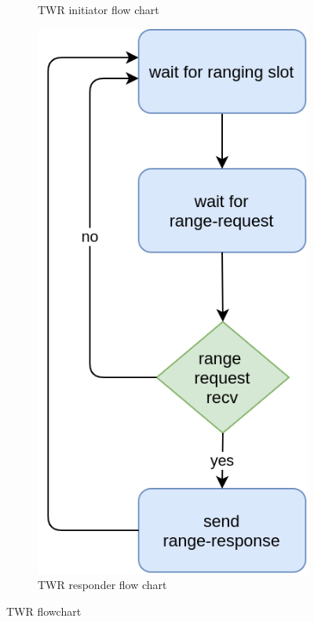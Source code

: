 \documentclass[\main/main.tex]{subfiles}
\begin{document}
\begin{figure}[H]
\begin{subfigure}[b]{0.47\textwidth}
\begin{center}
        \end{center}
        \caption{TWR initiator flow chart}
        \label{fig:twr_initiator}
    \end{subfigure}
    \hfill
    \begin{subfigure}[b]{0.47\textwidth}
        \begin{center}
            \includegraphics[scale=0.3]{twr_responder.png}
        \end{center}
        \caption{TWR responder flow chart}
        \label{fig:twr_responder}
    \end{subfigure}
    \caption{TWR flowchart}
\end{figure}
\end{document}
